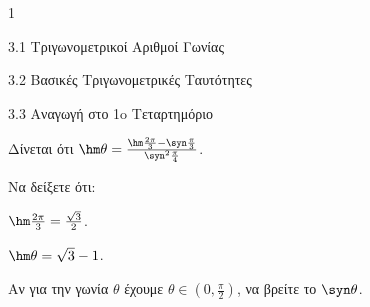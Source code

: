 \begin{ylh}{1}
\item 3.1 Τριγωνομετρικοί Αριθμοί Γωνίας
\item 3.2 Βασικές Τριγωνομετρικές Ταυτότητες
\item 3.3 Αναγωγή στο 1o Τεταρτημόριο
\end{ylh}
Δίνεται ότι $\hm \theta = \frac{\hm \frac{2\pi}{3} - \syn \frac{\pi}{3}}{\syn ^2\frac{\pi}{4}}$.
\begin{alist}
\item Να δείξετε ότι:
\begin{rlist}
\item $\hm \frac{2\pi}{3} = \frac{\sqrt{3}}{2}$.
\item $\hm \theta = \sqrt{3} - 1$.
\end{rlist}
\item Αν για την γωνία $\theta$ έχουμε $\theta \in \left(0, \frac{\pi}{2}\right)$, να βρείτε το $\syn \theta$.
\end{alist}

